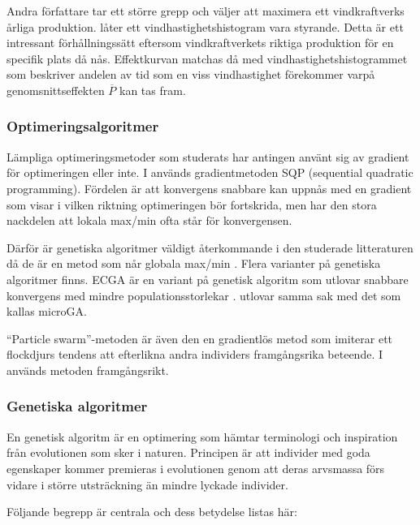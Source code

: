 Andra författare tar ett större grepp och väljer att maximera ett vindkraftverks årliga produktion. \citet{Victoria} låter ett vindhastighetshistogram vara styrande. Detta är ett intressant förhållningssätt eftersom vindkraftverkets riktiga produktion för en specifik plats då nås. Effektkurvan matchas då med vindhastighetshistogrammet som beskriver andelen av tid som en viss vindhastighet förekommer varpå genomsnittseffekten $\overline{P}$ kan tas fram.

\subsubsection{Optimeringsalgoritmer}
Lämpliga optimeringsmetoder som studerats har antingen använt sig av gradient för optimeringen eller inte. I \citet{Victoria} används gradientmetoden SQP (sequential quadratic programming). Fördelen är att konvergens snabbare kan uppnås med en gradient som visar i vilken riktning optimeringen bör fortskrida, men har den stora nackdelen att lokala max/min ofta står för konvergensen. 

Därför är genetiska algoritmer väldigt återkommande i den studerade litteraturen då de är en metod som når globala max/min \citep{Benini, 5MWkillen, LowRe, CST, Dansken}. Flera varianter på genetiska algoritmer finns. ECGA är en variant på genetisk algoritm som utlovar snabbare konvergens med mindre populationsstorlekar \citep{Xiong}. \citet{Grasso} utlovar samma sak med det som kallas microGA.

``Particle swarm''-metoden är även den en gradientlös metod som imiterar ett flockdjurs tendens att efterlikna andra individers framgångsrika beteende. I \citet{Cencelli} används metoden framgångsrikt.  



\subsubsection{Genetiska algoritmer}

En genetisk algoritm är en optimering som hämtar terminologi och inspiration från evolutionen som sker i naturen. Principen är att individer med goda egenskaper kommer premieras i evolutionen genom att deras arvsmassa förs vidare i större utsträckning än mindre lyckade individer.

Följande begrepp är centrala och dess betydelse listas här:

